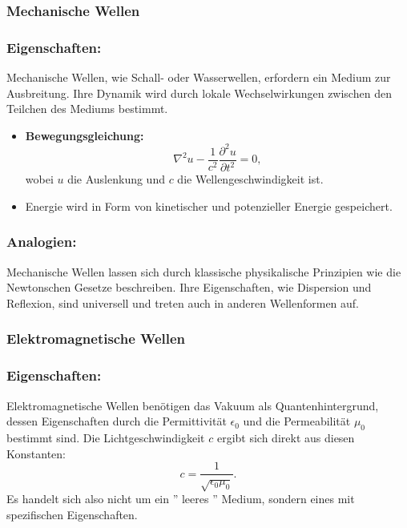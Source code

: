 \documentclass[12pt,a4paper]{article}
\begin{document}
	\subsubsection{Mechanische Wellen}
	
	\subsubsection{Eigenschaften:}
	Mechanische Wellen, wie Schall- oder Wasserwellen, erfordern ein Medium zur Ausbreitung. Ihre Dynamik wird durch lokale Wechselwirkungen zwischen den Teilchen des Mediums bestimmt.
	\begin{itemize}
		\item \textbf{Bewegungsgleichung:}
		\begin{equation}
			\nabla^2 u - \frac{1}{c^2} \frac{\partial^2 u}{\partial t^2} = 0,
		\end{equation}
		wobei $u$ die Auslenkung und $c$ die Wellengeschwindigkeit ist.
		\item Energie wird in Form von kinetischer und potenzieller Energie gespeichert.
	\end{itemize}
	
	\subsubsection{Analogien:}
	Mechanische Wellen lassen sich durch klassische physikalische Prinzipien wie die Newtonschen Gesetze beschreiben. Ihre Eigenschaften, wie Dispersion und Reflexion, sind universell und treten auch in anderen Wellenformen auf.
	
	\subsubsection{Elektromagnetische Wellen}
	
	\subsubsection{Eigenschaften:}
	Elektromagnetische Wellen benötigen das Vakuum als Quantenhintergrund, dessen Eigenschaften durch die Permittivität $\epsilon_0$ und die Permeabilität $\mu_0$ bestimmt sind. Die Lichtgeschwindigkeit $c$ ergibt sich direkt aus diesen Konstanten:
	\begin{equation}
		c = \frac{1}{\sqrt{\epsilon_0 \mu_0}}.
	\end{equation}
	Es handelt sich also nicht um ein '' leeres '' Medium, sondern eines mit spezifischen Eigenschaften.
	
\end{document}
